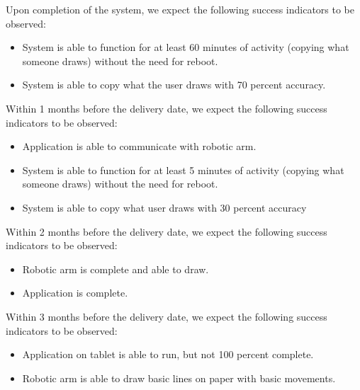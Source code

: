 
Upon completion of the  system, we expect the following success indicators to be observed:
\begin{itemize}
  \item System is able to function for at least 60 minutes of activity (copying what someone draws) without the need for reboot.
  \item System is able to copy what the user draws with 70 percent accuracy.
\end{itemize}

Within 1 months before the delivery date, we expect the following success indicators to be observed:
\begin{itemize}
  \item Application is able to communicate with robotic arm. 
  \item System is able to function for at least 5 minutes of activity (copying what someone draws) without the need for reboot.
  \item System is able to copy what user draws with 30 percent accuracy
\end{itemize}


Within 2 months before the delivery date, we expect the following success indicators to be observed:
\begin{itemize}
  \item Robotic arm is complete and able to draw. 
  \item Application is complete.
\end{itemize}

Within 3 months before the delivery date, we expect the following success indicators to be observed:
\begin{itemize}
  \item Application on tablet is able to run, but not 100 percent complete.
  \item Robotic arm is able to draw basic lines on paper with basic movements.
\end{itemize}





